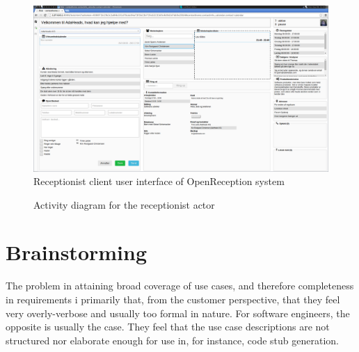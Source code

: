 \begin{figure}
  \includegraphics[scale=0.2]{img/openreception-client-ui.png}
  \caption{Receptionist client user interface of OpenReception system}
  \label{fig:openreception-client-ui}
\end{figure}

\begin{figure}[h]
\centering
\caption{Activity diagram for the receptionist actor}
\label{fig:activity_diagram_receptionist}
\end{figure}



\section{Brainstorming}
The problem in attaining broad coverage of use cases, and therefore completeness in requirements i primarily that, from the customer perspective, that they feel very overly-verbose and usually too formal in nature. For software engineers, the opposite is usually the case. They feel that the use case descriptions are not structured nor elaborate enough for use in, for instance, code stub generation.

